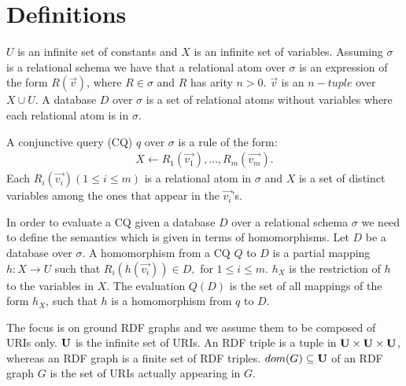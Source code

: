 \section{Definitions}

\begin{definition}
	$U$ is an infinite set of constants and $X$ is an infinite set of variables.
	Assuming $\sigma$ is a relational schema we have that a relational atom over
	$\sigma$ is an expression of the form $R(\vec{v})$, where $R \in \sigma$ and 
	$R$ has arity $n>0$. $\vec{v}$ is an $n-tuple$ over $X \cup U$.
	A database $D$ over $\sigma$ is a set of relational atoms without variables
	where each relational atom is in $\sigma$.

	A conjunctive query (CQ) $q$ over $\sigma$ is a rule of the form:
	\begin{align*}
		X \leftarrow R_1(\vec{v_1}), \dots, R_m(\vec{v_m}).
	\end{align*}
	Each $R_i(\vec{v_i}) (1\leq i \leq m)$ is a relational atom in $\sigma$ and 
	$X$ is a set of distinct variables among the ones that appear in the
	$\vec{v_i}$'s.

	In order to evaluate a CQ given a database $D$ over a relational schema $\sigma$
	we need to define the semantics which is given in terms of homomorphisms.
	Let $D$ be a database over $\sigma$.  A homomorphism from a CQ $Q$ to $D$ is a
	partial mapping $h: X \rightarrow U$ such that $R_i(h(\vec{v_i})) \in D,$ for 
	$1 \leq i \leq m$. $h_{X}$ is the restriction of $h$ to the variables in
	$X$. The evaluation $Q(D)$ is the set of all mappings of the form
	$h_{X}$, such that $h$ is a homomorphism from $q$ to $D$.
\end{definition}


\begin{definition}[RDF]
	The focus is on ground RDF graphs and we assume them to be composed of URIs only.
	$\mathbf{U}$ is the infinite set of URIs. An RDF triple is a tuple in $\mathbf{U} \times \mathbf{U} \times \mathbf{U}$, whereas an
	RDF graph is a finite set of RDF triples. $dom(G) \subseteq \mathbf{U}$ of an RDF graph $G$ is the set of URIs actually appearing in $G$.
\end{definition}

